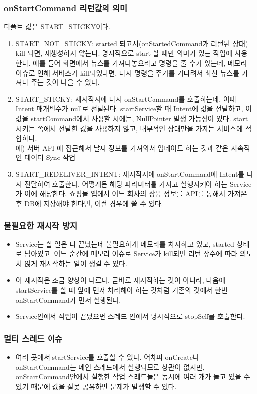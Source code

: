 \documentclass{beamer}
\newcommand\Fontvi{\fontsize{8}{9.6}\selectfont}
\begin{document}
\begin{frame}
\frametitle{onStartCommand 리턴값의 의미}
\Fontvi
디폴트 값은 START\_STICKY이다.
\begin{enumerate}
\item START\_NOT\_STICKY: started 되고서(onStartedCommand가 리턴된 상태) kill 되면, 재생성하지 않는다. 명시적으로 start 할 때만 의미가 있는 작업에 사용한다. 예를 들어 화면에서 뉴스를 가져다놓으라고 명령을 줄 수가 있는데, 메모리 이슈로 인해 서비스가 kill되었다면, 다시 명령을 주기를 기다려서 최신 뉴스를 가져다 주는 것이 나을 수 있다.
\item START\_STICKY: 재시작시에 다시 onStartCommand를 호출하는데, 이때 Intent 매개변수가 null로 전달된다. startService할 때 Intent에 값을 전달하고, 이 값을 startCommand에서 사용할 시에는, NullPointer 발생 가능성이 있다. start 시키는 쪽에서 전달한 값을 사용하지 않고, 내부적인 상태만을 가지는 서비스에 적합하다.\\
예) 서버 API 에 접근해서 날씨 정보를 가져와서 업데이트 하는 것과 같은 지속적인 데이터 Sync 작업
\item START\_REDELIVER\_INTENT:  재시작시에 onStartCommand에 Intent를 다시 전달하여 호출한다. 어떻게든 해당 파라미터를 가지고 실행시켜야 하는 Service가 이에 해당한다. 쇼핑몰 앱에서 어느 회사의 상품 정보를 API를 통해서 가져온 후 DB에 저장해야 한다면, 이런 경우에 쓸 수 있다.\\
\end{enumerate}
\end{frame}

\begin{frame}
\frametitle{불필요한 재시작 방지}
\begin{itemize}
\item Service는 할 일은 다 끝났는데 불필요하게 메모리를 차지하고 있고, started 상태로 남아있고, 어느 순간에 메모리 이슈로 Service가 kill되면 리턴 상수에 따라 의도치 않게 재시작하는 일이 생길 수 있다.
\item 이 재시작은 조금 양상이 다르다. 곧바로 재시작하는 것이 아니라, 다음에 startService를 할 때 앞에 먼저 처리해야 하는 것처럼 기존의 것에서 한번 onStartCommand가 먼저 실행된다.
\item Service안에서 작업이 끝났으면 스레드 안에서 명시적으로 stopSelf를 호출한다.
\end{itemize}
\end{frame}

\begin{frame}
\frametitle{멀티 스레드 이슈}
\begin{itemize}
\item 여러 곳에서 startService를 호출할 수 있다. 어차피 onCreate나 onStartCommand는 메인 스레드에서 실행되므로 상관이 없지만, onStartCommand안에서 실행한 작업 스레드들은 동시에 여러 개가 돌고 있을 수 있기 때문에 값을 잘못 공유하면 문제가 발생할 수 있다.
\end{itemize}
\end{frame}
\end{document}
